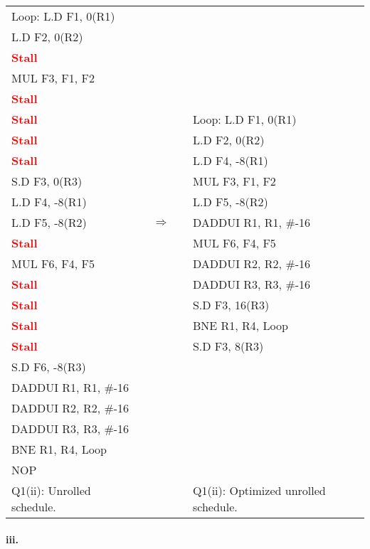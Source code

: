 \documentclass[11pt]{article}
\renewcommand{\part}[1]{\paragraph*{{#1}.}}
\newcommand{\code}[1]{\textsf{#1}}
\newcommand{\stall}{\textcolor{red}{\textbf{Stall}}}
\begin{document}
\begin{table}[h]
\begin{tabular}{lcccl}
	  \code{Loop:} \code{L.D F1, 0(R1)} & & & &  \\
	 \code{L.D F2, 0(R2)} & & & &  \\
	 \stall & & & &   \\
	 \code{MUL F3, F1, F2} & & & &  \\
	 \stall & & & &  \\
	 \stall & & & &  \code{Loop:} \code{L.D F1, 0(R1)}  \\
	 \stall & & & &  \code{L.D F2, 0(R2)} \\
	 \stall & & & & \code{L.D F4, -8(R1)}  \\
	 \code{S.D F3, 0(R3)} & & & & \code{MUL F3, F1, F2}  \\
	 \code{L.D F4, -8(R1)} & & & &  \code{L.D F5, -8(R2)}  \\
	 \code{L.D F5, -8(R2)} & & $\Rightarrow$ & & \code{DADDUI R1, R1, \#-16} \\
	 \stall & & & &  \code{MUL F6, F4, F5} \\
	 \code{MUL F6, F4, F5} & & & & \code{DADDUI R2, R2, \#-16}  \\
	 \stall & & & &  \code{DADDUI R3, R3, \#-16} \\
	 \stall  & & & & \code{S.D F3, 16(R3)} \\
	 \stall & & & & \code{BNE R1, R4, Loop}  \\
	 \stall & & & & \code{S.D F3, 8(R3)}  \\	 
	 \code{S.D F6, -8(R3)} & & & &  \\
	 \code{DADDUI R1, R1, \#-16} & & & &  \\
	 \code{DADDUI R2, R2, \#-16} & & & &  \\
	 \code{DADDUI R3, R3, \#-16} & & & &  \\
	 \code{BNE R1, R4, Loop} & & & &  \\
	 \code{NOP} & & & & \\
	 Q1(ii): Unrolled schedule. & & & & Q1(ii): Optimized unrolled schedule.
\end{tabular}
\label{tbl:q1p2}
\end{table}


\part{iii} 
\end{document}
